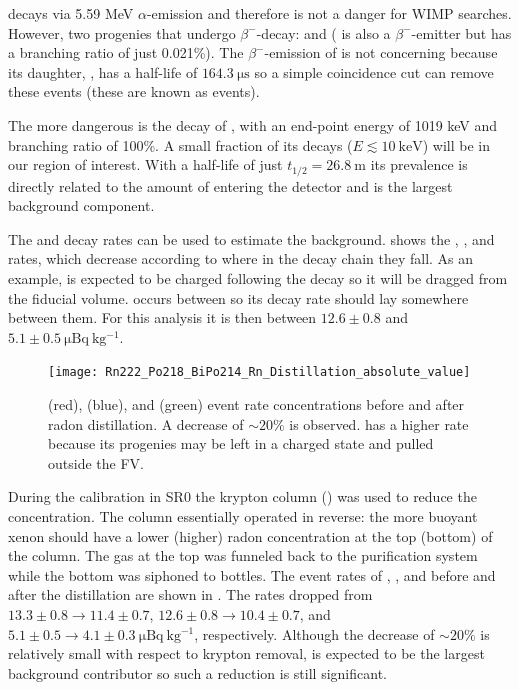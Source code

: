 decays via 5.59 MeV $\alpha$-emission and therefore is not a danger for WIMP searches.  However, two progenies that undergo
$\beta^-$-decay:  and  ( is also a $\beta^-$-emitter but has a branching ratio of just
0.021\%).  The $\beta^-$-emission of  is not concerning because its daughter, , has a half-life of
$164.3\ \mathrm{\mu s}$ so a simple coincidence cut can remove these events (these are known as  events).

The more dangerous is the decay of , with an end-point energy of 1019 keV and branching ratio of 100\%.  A small fraction of
its decays ($E \lesssim 10\ \mathrm{keV}$) will be in our region of interest.  With a half-life of just $t_{1/2} = 26.8\ \mathrm{m}$ its
prevalence is directly related to the amount of  entering the detector and is the largest background component.

The  and  decay rates can be used to estimate the 
background.   shows the , , and  rates,
which decrease according to where in the decay chain they fall.  As an example,  is expected to be charged following the
 decay so it will be dragged from the fiducial volume.   occurs between   so its
decay rate should lay somewhere between them.  For this analysis it is then between $12.6 \pm 0.8$ and
$5.1 \pm 0.5\ \mathrm{\mu Bq\ kg^{-1}}$.

\begin{figure}
\centering
\texttt{[image: Rn222\_Po218\_BiPo214\_Rn\_Distillation\_absolute\_value]}
\caption{ (red),  (blue), and  (green) event rate concentrations before and after radon
distillation.  A decrease of ${\sim} 20\%$ is observed.   has a higher rate because its progenies may be left in a charged
state and pulled outside the FV.}
\label{fig:backgrounds_electronic_radon_distillation}
\end{figure}

During the  calibration in SR0 the krypton column () was used to reduce the 
concentration.  The column essentially operated in reverse: the more buoyant xenon should have a lower (higher) radon concentration at the
top (bottom) of the column.  The gas at the top was funneled back to the purification system while the bottom was siphoned to
bottles.  The event rates of , , and  before and after the distillation are shown
in .  The rates dropped from $13.3 \pm 0.8 \rightarrow 11.4 \pm 0.7$,
$12.6 \pm 0.8 \rightarrow 10.4 \pm 0.7$, and $5.1 \pm 0.5 \rightarrow 4.1 \pm 0.3\ \mathrm{\mu Bq\ kg^{-1}}$, respectively.  Although the
decrease of ${\sim}20\%$ is relatively small with respect to krypton removal,  is expected to be the largest background
contributor so such a reduction is still significant.

